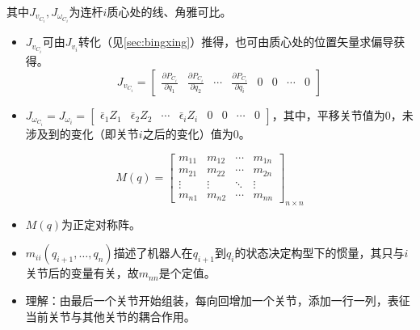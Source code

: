 \documentclass[
12pt, %
a4paper, 
oneside, %
headinclude,footinclude, %
]{scrartcl}
\begin{document}
其中$ J_{v_{C_i}}, J_{\omega_{C_i}} $为连杆$ i $质心处的线、角雅可比。
\begin{itemize}
\item $ J_{v_{C_i}} $可由$ J_{v_i} $转化（见\ref{sec:bingxing}）推得，也可由质心处的位置矢量求偏导获得。
$$ J_{v_{C_i}} = \begin{bmatrix} \frac{\partial P_{C_i}}{\partial q_1} & \frac{\partial P_{C_i}}{\partial q_2} & \cdots & \frac{\partial P_{C_i}}{\partial q_i} & 0 & 0 & \cdots & 0 \end{bmatrix} $$
\item $ J_{\omega_{C_i}} = J_{\omega_i} = \begin{bmatrix} \bar{\epsilon}_1 Z_1 & \bar{\epsilon}_2 Z_2 & \cdots & \bar{\epsilon}_i Z_i & 0 & 0 & \cdots & 0 \end{bmatrix} $，其中，平移关节值为$ 0 $，未涉及到的变化（即关节$ i $之后的变化）值为$ 0 $。
\end{itemize}
$$ M(q) = \begin{bmatrix} m_{11} & m_{12} & \cdots & m_{1n} \\ m_{21} & m_{22} & \cdots & m_{2n} \\ \vdots & \vdots & \ddots & \vdots \\ m_{n1} & m_{n2} & \cdots & m_{nn} \end{bmatrix}_{n \times n} $$
\begin{itemize}
\item $ M(q) $为正定对称阵。
\item $ m_{ii}(q_{i + 1}, \dots, q_n) $描述了机器人在$ q_{i + 1} $到$ q_i $的状态决定构型下的惯量，其只与$ i $关节后的变量有关，故$ m_{nn} $是个定值。
\item 理解：由最后一个关节开始组装，每向回增加一个关节，添加一行一列，表征当前关节与其他关节的耦合作用。
\end{itemize}
\end{document}

